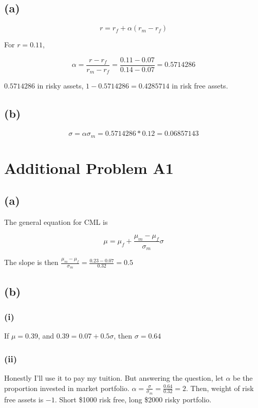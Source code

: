 \documentclass[11pt]{scrartcl}
\begin{document}
\subsection*{(a)}

\[r = r_f + \alpha(r_m - r_f)\]

For $r = 0.11$,

\[\alpha = \frac{r-r_f}{r_m - r_f} = \frac{0.11 - 0.07}{0.14-0.07} = 0.5714286\]

$0.5714286$ in risky assets, $1-0.5714286 = 0.4285714$ in risk free assets.

\subsection*{(b)}

\[\sigma = \alpha\sigma_m = 0.5714286 * 0.12 = 0.06857143\]

\section*{Additional Problem A1}

\subsection*{(a)}

The general equation for CML is

\[\mu = \mu_f + \frac{\mu_m - \mu_f}{\sigma_m}\sigma\]

The slope is then $\frac{\mu_m - \mu_f}{\sigma_m} = \frac{0.23-0.07}{0.32} = 0.5$

\subsection*{(b)}

\subsubsection*{(i)}

If $\mu=0.39$, and $0.39 = 0.07 + 0.5\sigma$, then $\sigma = 0.64$

\subsubsection*{(ii)}

Honestly I'll use it to pay my tuition. But answering the question, let $\alpha$ be the proportion invested in market portfolio. $\alpha = \frac{\sigma}{\sigma_m} = \frac{0.64}{0.32} = 2$. Then, weight of risk free assets is $-1$. Short \$1000 risk free, long \$2000 risky portfolio.
\end{document}
